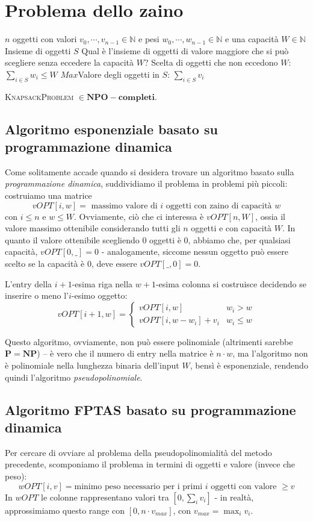 \section{Problema dello zaino}
 {$n$ oggetti con valori $v_0, \cdots, v_{n-1} \in \mathbb{N}$ e
	pesi $w_0, \cdots, w_{n-1} \in \mathbb{N}$ e una capacità $W \in \mathbb{N}$} {Insieme di oggetti $S$}
{Qual è l'insieme di oggetti di valore maggiore che si può scegliere senza eccedere
	la capacità $W$?}
{Scelta di oggetti che non eccedono $W$: $\sum_{i \in S} w_i \leq W$}
{$Max$}{Valore degli oggetti in $S$: $\sum_{i \in S} v_i$}

\begin{theorem}
	\textsc{KnapsackProblem} $\in \mathbf{NPO-completi}$.
\end{theorem}

\subsection{Algoritmo esponenziale basato su programmazione dinamica}
Come solitamente accade quando si desidera trovare un algoritmo basato
sulla \textit{programmazione dinamica}, suddividiamo il problema in problemi
più piccoli: costruiamo una matrice
$$
	vOPT[i, w] =  \text{ massimo valore di } i \text{ oggetti con zaino di capacità } w
$$
con $ i \leq n$ e $w \leq W$. Ovviamente, ciò che ci interessa è $vOPT[n, W]$,
ossia il valore massimo ottenibile considerando tutti gli $n$ oggetti
e con capacità $W$.
In quanto il valore ottenibile scegliendo $0$ oggetti è $0$, abbiamo che, per qualsiasi
capacità, $vOPT[0, \_] = 0$ - analogamente, siccome nessun oggetto può essere scelto
se la capacità è $0$, deve essere $vOPT[\_, 0]  = 0$.

L'entry della $i+1$-esima riga nella $w+1$-esima colonna
si costruisce decidendo se inserire o meno l'$i$-esimo oggetto:
$$
	vOPT[i+1, w] =
	\begin{cases}
		vOPT[i, w]             & w_i > w    \\
		vOPT[i, w - w_i] + v_i & w_i \leq w
	\end{cases}
$$

Questo algoritmo, ovviamente, non può essere polinomiale (altrimenti sarebbe
$\mathbf{P} = \mathbf{NP}$) -- è vero che il
numero di entry nella matrice è $n \cdot w$, ma l'algoritmo non è polinomiale nella
lunghezza binaria dell'input $W$, bensì è esponenziale, rendendo quindi l'algoritmo
\textit{pseudopolinomiale}.

\subsection{Algoritmo FPTAS basato su programmazione dinamica}
Per cercare di ovviare al problema della pseudopolinomialità del metodo precedente,
scomponiamo il problema in termini di oggetti e valore (invece che peso):
$$
	wOPT[i, v] = \text{minimo peso necessario per i primi } i \text{ oggetti con valore } \geq v
$$
In $wOPT$ le colonne rappresentano valori tra $[0, \sum_{i}v_i]$ - in realtà,
approssimiamo questo range con $[0, n\cdot v_{max}]$, con $v_{max} = \max_i v_i$.

